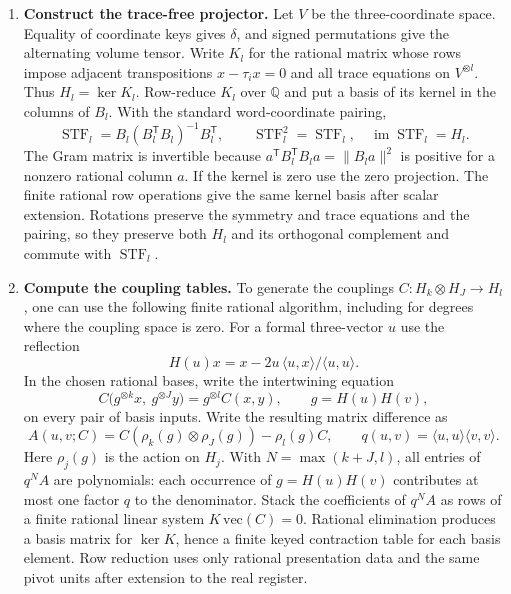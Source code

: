 \documentclass[11pt,a4paper]{article}
\theoremstyle{definition}
\theoremstyle{remark}\newaliascnt{remark}{theorem}
\newcommand{\Q}{\mathbb Q}
\newcommand{\STF}{\operatorname{STF}}
\numberwithin{equation}{section}
\begin{document}
\begin{enumerate}[titledsteps]
    \item \textbf{Construct the trace-free projector.} Let \(V\) be the three-coordinate space. Equality of coordinate keys gives \(\delta\), and signed permutations give the alternating volume tensor. Write \(K_l\) for the rational matrix whose rows impose adjacent transpositions \(x-\tau_i x=0\) and all trace equations on \(V^{\otimes l}\). Thus \(H_l=\ker K_l\). Row-reduce \(K_l\) over \(\Q\) and put a basis of its kernel in the columns of \(B_l\). With the standard word-coordinate pairing,
\[
 \STF_l=B_l(B_l^{\mathsf T}B_l)^{-1}B_l^{\mathsf T},\qquad
 \STF_l^2=\STF_l,\quad \operatorname{im}\STF_l=H_l .
\]
The Gram matrix is invertible because \(a^{\mathsf T}B_l^{\mathsf T}B_l a=\|B_la\|^2\) is positive for a nonzero rational column \(a\). If the kernel is zero use the zero projection. The finite rational row operations give the same kernel basis after scalar extension. Rotations preserve the symmetry and trace equations and the pairing, so they preserve both \(H_l\) and its orthogonal complement and commute with \(\STF_l\).


    \item \textbf{Compute the coupling tables.} To generate the couplings $C:H_k\otimes H_J\to H_l$, one can use the following finite rational algorithm, including for degrees where the coupling space is zero. For a formal three-vector $u$ use the reflection
\[
   H(u)x=x-2u\,\langle u,x\rangle/\langle u,u\rangle .
\]
In the chosen rational bases, write the intertwining equation
\[
 C\bigl(g^{\otimes k}x,\ g^{\otimes J}y\bigr)
       =g^{\otimes l} C(x,y),\qquad g=H(u)H(v),
\]
on every pair of basis inputs. Write the resulting matrix difference as
\[
 A(u,v;C)=C(\rho_k(g)\otimes\rho_J(g))-\rho_l(g)C,\qquad
 q(u,v)=\langle u,u\rangle\langle v,v\rangle .
\]
Here \(\rho_j(g)\) is the action on \(H_j\). With \(N=\max(k+J,l)\), all entries of \(q^N A\) are polynomials: each occurrence of \(g=H(u)H(v)\) contributes at most one factor \(q\) to the denominator. Stack the coefficients of \(q^NA\) as rows of a finite rational linear system \(K\,\mathrm{vec}(C)=0\). Rational elimination produces a basis matrix for \(\ker K\), hence a finite keyed contraction table for each basis element. Row reduction uses only rational presentation data and the same pivot units after extension to the real register.



\end{enumerate}
\end{document}
